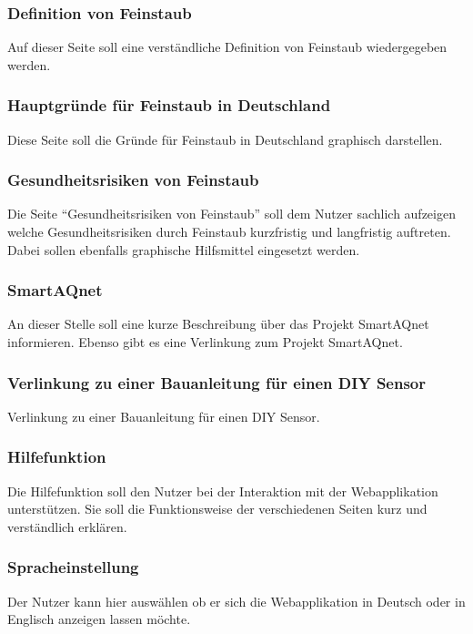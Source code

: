 \subsubsection{Definition von \gls{Feinstaub}}
Auf dieser Seite soll eine verständliche Definition von \gls{Feinstaub} wiedergegeben werden.


\subsubsection{Hauptgründe für \gls{Feinstaub} in Deutschland}
Diese Seite soll die Gründe für \gls{Feinstaub} in Deutschland graphisch darstellen.


\subsubsection{Gesundheitsrisiken von \gls{Feinstaub}}
Die Seite \enquote{Gesundheitsrisiken von \gls{Feinstaub}} soll dem Nutzer sachlich aufzeigen welche Gesundheitsrisiken durch \gls{Feinstaub} kurzfristig und langfristig auftreten. 
Dabei sollen ebenfalls graphische Hilfsmittel eingesetzt werden.

\subsubsection{SmartAQnet}
An dieser Stelle soll eine kurze Beschreibung über das Projekt SmartAQnet informieren. 
Ebenso gibt es eine Verlinkung zum Projekt SmartAQnet.

\subsubsection{Verlinkung zu einer Bauanleitung für einen \gls{DIY} \gls{Sensor}}
Verlinkung zu einer Bauanleitung für einen \gls{DIY} \gls{Sensor}.

\subsubsection{Hilfefunktion}
Die Hilfefunktion soll den Nutzer bei der Interaktion mit der Webapplikation unterstützen. Sie soll die Funktionsweise der verschiedenen Seiten kurz und verständlich erklären.

\subsubsection{Spracheinstellung}
Der Nutzer kann hier auswählen ob er sich die Webapplikation in Deutsch oder in Englisch anzeigen lassen möchte.

